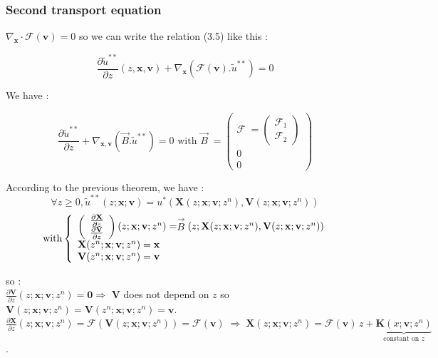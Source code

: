 \documentclass[10pt]{article}
\newcommand{\D}{{\partial}}
\begin{document}
\subsubsection{Second transport equation}


$\nabla_{\mathbf{x}}\cdot\bm{\mathcal{F}}(\mathbf{v}) = 0$ so we can write the relation (3.5) like this :

$$\frac{\D \tilde{u}^{**}}{\D z}(z,\mathbf{x,v}) + \nabla_{\mathbf{x}}\left(\bm{\mathcal{F}}(\mathbf{v}).\tilde{u}^{**}\right) = 0$$

We have :

$$\frac{\D \tilde{u}^{**}}{\D z} + \nabla_{\mathbf{x,v}}\left(\stackrel{\rightarrow}{B}.\tilde{u}^{**}\right) = 0 \mbox{ with } \stackrel{\rightarrow}{B}\; = \left(\begin{array}{c}
\bm{\mathcal{F}}\; = \left(\begin{array}{c}
\mathcal{F}_1 \\ \mathcal{F}_2
\end{array}\right) \\ 0 \\ 0
\end{array}\right)$$


According to the previous theorem, we have :
$$
\forall z\geqslant 0, \tilde{u}^{**}(z;\mathbf{x;v}) = u^*\left(\mathbf{X}(z;\mathbf{x;v};z^n),\mathbf{V}(z;\mathbf{x;v};z^n)\right)
$$
$$
\mbox{ with} \\
\left\lbrace\begin{array}{l}
\left(\begin{array}{c}
\frac{\D \mathbf{X}}{\D z} \\ \frac{\D \mathbf{V}}{\D z}
\end{array}\right) (z;\mathbf{x;v};z^n) = \stackrel{\rightarrow}{B}\left(z;\mathbf{X}(z;\mathbf{x;v};z^n),\mathbf{V}(z;\mathbf{x;v};z^n)\right) \\
\mathbf{X}(z^n;\mathbf{x;v};z^n) = \mathbf{x} \\
\mathbf{V}(z^n;\mathbf{x;v};z^n) = \mathbf{v}
\end{array}
\right.
$$

so : \\ $\frac{\D \mathbf{V}}{\D z}(z;\mathbf{x;v};z^n) = \mathbf{0} \Rightarrow$ $\mathbf{V}$ does not depend on $z$ so $\mathbf{V}(z;\mathbf{x;v};z^n) = \mathbf{V}(z^n;\mathbf{x;v};z^n) = \mathbf{v}$. \\
$\frac{\D \mathbf{X}}{\D z}(z;\mathbf{x;v};z^n) = \bm{\mathcal{F}}(\mathbf{V}(z;\mathbf{x;v};z^n)) = \bm{\mathcal{F}}(\mathbf{v})\; \Rightarrow \; \mathbf{X}(z;\mathbf{x;v};z^n) = \bm{\mathcal{F}}(\mathbf{v})\,z + \underbrace{\mathbf{K}(x;\mathbf{v};z^n)}_{\mbox{constant on } z}
$. \\
\end{document}
